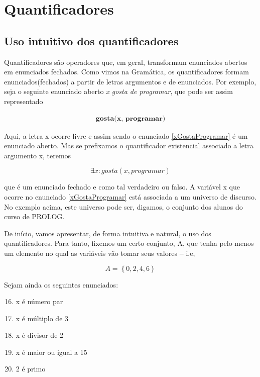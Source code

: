 \chapter{Quantificadores}

\section{Uso intuitivo dos quantificadores}

Quantificadores são operadores que, em geral, transformam enunciados abertos em  enunciados fechados.
Como vimos na Gramática, os quantificadores formam enunciados(fechados) a partir de  letras argumentos e  de  enunciados.
Por exemplo, seja o seguinte enunciado aberto \textit{x gosta de programar}, que pode ser assim representado

\begin{align*}
    \textbf{gosta(x, programar)} \tag{1} \label{xGostaProgramar}
\end{align*}

Aqui, a letra x ocorre livre e assim sendo o enunciado \ref{xGostaProgramar} é um enunciado aberto.
Mas se prefixamos o quantificador existencial associado a letra argumento x, teremos

$$\exists x \colon gosta(x, programar)$$

\noindent que é um enunciado fechado e como tal verdadeiro ou falso.
A variável x que ocorre no enunciado \ref{xGostaProgramar} está associada a um universo de discurso.
No  exemplo acima, este universo pode ser, digamos, o conjunto dos alunos do curso de PROLOG.

De início, vamos apresentar, de forma intuitiva e natural, o uso dos quantificadores.
Para tanto, fixemos um certo conjunto, A, que tenha pelo menos um  elemento no  qual as variáveis vão tomar seus valores \textbf{--} i.e,

$$A = \left\{ 0, 2, 4, 6\right\}$$

Sejam ainda os seguintes enunciados:
\begin{enumerate}[label=\textbf{\alph*(x)} $\colon$]
    \setcounter{enumi}{15}
    \item x é número par
    \item x é múltiplo de 3
    \item x é divisor de 2
    \item x é maior ou igual a 15
    \item 2 é primo
\end{enumerate}

